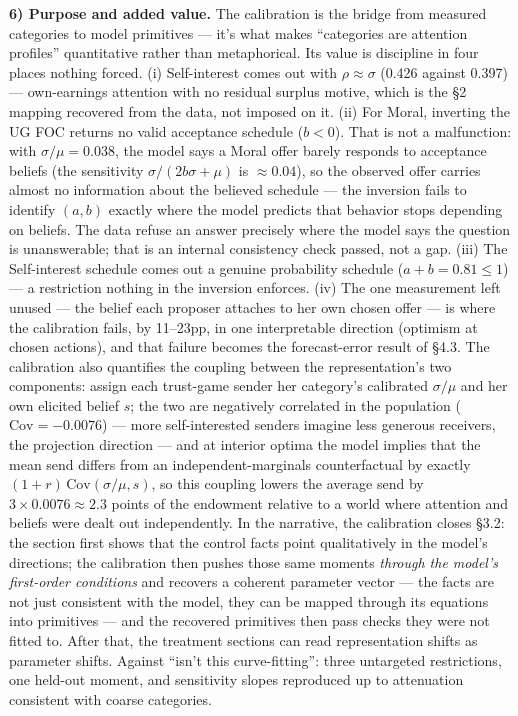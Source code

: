 \documentclass[11pt]{article}
\begin{document}
\textbf{6) Purpose and added value.} The calibration is the bridge from measured categories to model primitives --- it's what makes ``categories are attention profiles'' quantitative rather than metaphorical. Its value is discipline in four places nothing forced. (i) Self-interest comes out with $\rho \approx \sigma$ (0.426 against 0.397) --- own-earnings attention with no residual surplus motive, which is the \S2 mapping recovered from the data, not imposed on it. (ii) For Moral, inverting the UG FOC returns no valid acceptance schedule ($b < 0$). That is not a malfunction: with $\sigma/\mu = 0.038$, the model says a Moral offer barely responds to acceptance beliefs (the sensitivity $\sigma/(2b\sigma+\mu)$ is $\approx 0.04$), so the observed offer carries almost no information about the believed schedule --- the inversion fails to identify $(a,b)$ exactly where the model predicts that behavior stops depending on beliefs. The data refuse an answer precisely where the model says the question is unanswerable; that is an internal consistency check passed, not a gap. (iii) The Self-interest schedule comes out a genuine probability schedule ($a+b = 0.81 \le 1$) --- a restriction nothing in the inversion enforces. (iv) The one measurement left unused --- the belief each proposer attaches to her own chosen offer --- is where the calibration fails, by 11--23pp, in one interpretable direction (optimism at chosen actions), and that failure becomes the forecast-error result of \S4.3. The calibration also quantifies the coupling between the representation's two components: assign each trust-game sender her category's calibrated $\sigma/\mu$ and her own elicited belief $s$; the two are negatively correlated in the population ($\mathrm{Cov} = -0.0076$) --- more self-interested senders imagine less generous receivers, the projection direction --- and at interior optima the model implies that the mean send differs from an independent-marginals counterfactual by exactly $(1+r)\,\mathrm{Cov}(\sigma/\mu, s)$, so this coupling lowers the average send by $3 \times 0.0076 \approx 2.3$ points of the endowment relative to a world where attention and beliefs were dealt out independently. In the narrative, the calibration closes \S3.2: the section first shows that the control facts point qualitatively in the model's directions; the calibration then pushes those same moments \emph{through the model's first-order conditions} and recovers a coherent parameter vector --- the facts are not just consistent with the model, they can be mapped through its equations into primitives --- and the recovered primitives then pass checks they were not fitted to. After that, the treatment sections can read representation shifts as parameter shifts. Against ``isn't this curve-fitting'': three untargeted restrictions, one held-out moment, and sensitivity slopes reproduced up to attenuation consistent with coarse categories.
\end{document}
